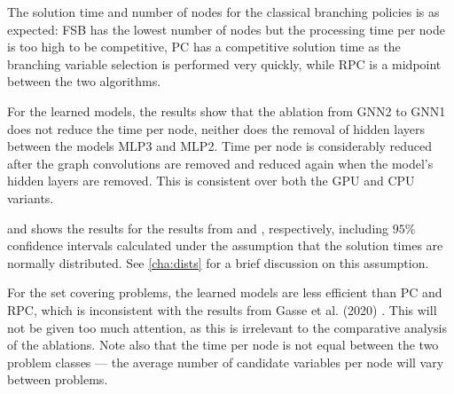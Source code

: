 The solution time and number of nodes for the classical branching policies is as expected: \gls{FSB} has the lowest number of nodes but the processing time per node is too high to be competitive, \gls{PC} has a competitive solution time as the branching variable selection is performed very quickly, while \gls{RPC} is a midpoint between the two algorithms. 

For the learned models, the results show that the ablation from GNN2 to GNN1 does not reduce the time per node, neither does the removal of hidden layers between the models MLP3 and MLP2. Time per node is considerably reduced after the graph convolutions are removed and reduced again when the model's hidden layers are removed. This is consistent over both the \gls{GPU} and \gls{CPU} variants.  



 and  shows the results for the results from  and , respectively, including $95 \%$ confidence intervals calculated under the assumption that the solution times are normally distributed. See \cref{cha:dists} for a brief discussion on this assumption.

For the set covering problems, the learned models are less efficient than \gls{PC} and \gls{RPC}, which is inconsistent with the results from Gasse et al. (2020) \cite{gasse2019exact}. This will not be given too much attention, as this is irrelevant to the comparative analysis of the ablations.
Note also that the time per node is not equal between the two problem classes --- the average number of candidate variables per node will vary between problems.  

